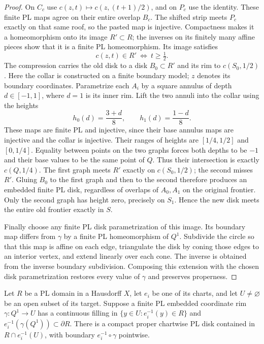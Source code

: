 \begin{proof}
On $C_c$ use $c(z,t)\mapsto c(z,(t+1)/2)$, and on $P_c$ use
the identity.  These finite PL maps agree on their entire overlap
$B_c$.  The shifted strip meets $P_c$ exactly on that same roof,
so the pasted map is injective.  Compactness makes it a homeomorphism
onto its image $R'\subset R$; the inverses on its finitely many
affine pieces show that it is a finite PL homeomorphism.  Its image satisfies
\[
 c(z,t)\in R'\ \Longleftrightarrow\ t\geq\tfrac12.
\]
The compression carries the old disk to a disk $B_0\subset R'$ and
its rim to $c(S_0,1/2)$.  Here the collar is constructed on a finite
boundary model; $z$ denotes its boundary coordinates.
Parametrize each $A_i$ by a square annulus of depth $d\in[-1,1]$,
where $d=1$ is its inner rim.  Lift the two annuli into the collar
using the heights
\[
                 h_0(d)=\frac{3+d}{8},\qquad
                 h_1(d)=\frac{1-d}{8}.
\]
These maps are finite PL and injective, since their base annulus
maps are injective and the collar is injective.  Their ranges of
heights are $[1/4,1/2]$ and $[0,1/4]$.  Equality between points on
the two graphs forces both depths to be $-1$ and their base values
to be the same point of $Q$.  Thus their intersection is exactly
$c(Q,1/4)$.  The first graph meets $R'$ exactly on
$c(S_0,1/2)$; the second misses $R'$.  Gluing $B_0$ to the first
graph and then to the second therefore produces an embedded finite
PL disk, regardless of overlaps of $A_0,A_1$ on the original frontier.
Only the second graph has height zero, precisely on $S_1$.
Hence the new disk meets the entire old frontier exactly in $S$.

Finally choose any finite PL disk parametrization of this image.
Its boundary map differs from $\gamma$ by a finite PL homeomorphism
of $Q^1$.  Subdivide the circle so that this map is affine on each
edge, triangulate the disk by coning those edges to an interior
vertex, and extend linearly over each cone.  The inverse is obtained
from the inverse boundary subdivision.  Composing this extension
with the chosen disk parametrization restores every value of
$\gamma$ and preserves properness.
\end{proof}

\begin{lemma}
\label{lem:dehn-chart-proper}
Let $R$ be a PL domain in a Hausdorff $X$, let $e_i$ be one of its
charts, and let $U\ne\varnothing$ be an open subset of its target.
Suppose a finite PL embedded coordinate rim $\gamma:Q^1\to U$
has a continuous filling in
$\{y\in U:e_i^{-1}(y)\in R\}$ and
$e_i^{-1}(\gamma(Q^1))\subset\partial R$.
There is a compact proper chartwise PL disk contained in
$R\cap e_i^{-1}(U)$, with boundary $e_i^{-1}\circ\gamma$ pointwise.
\end{lemma}


